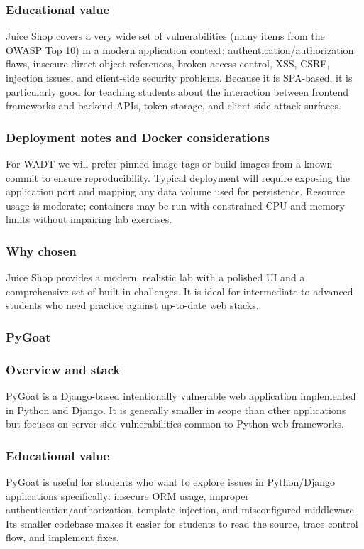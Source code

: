 \documentclass[12pt]{article}
\begin{document}
\subsubsection*{Educational value}	
Juice Shop covers a very wide set of vulnerabilities (many items from the OWASP Top 10) in a modern application context: authentication/authorization flaws, insecure direct object references, broken access control, XSS, CSRF, injection issues, and client-side security problems. Because it is SPA-based, it is particularly good for teaching students about the interaction between frontend frameworks and backend APIs, token storage, and client-side attack surfaces.

\subsubsection*{Deployment notes and Docker considerations}
For WADT we will prefer pinned image tags or build images from a known commit to ensure reproducibility. Typical deployment will require exposing the application port and mapping any data volume used for persistence. Resource usage is moderate; containers may be run with constrained CPU and memory limits without impairing lab exercises.

\subsubsection*{Why chosen}
Juice Shop provides a modern, realistic lab with a polished UI and a comprehensive set of built-in challenges. It is ideal for intermediate-to-advanced students who need practice against up-to-date web stacks.


\subsubsection{PyGoat}

\subsubsection*{Overview and stack}
PyGoat is a Django-based intentionally vulnerable web application implemented in Python and Django. It is generally smaller in scope than other applications but focuses on server-side vulnerabilities common to Python web frameworks.

\subsubsection*{Educational value}
PyGoat is useful for students who want to explore issues in Python/Django applications specifically: insecure ORM usage, improper authentication/authorization, template injection, and misconfigured middleware. Its smaller codebase makes it easier for students to read the source, trace control flow, and implement fixes.
\end{document}
